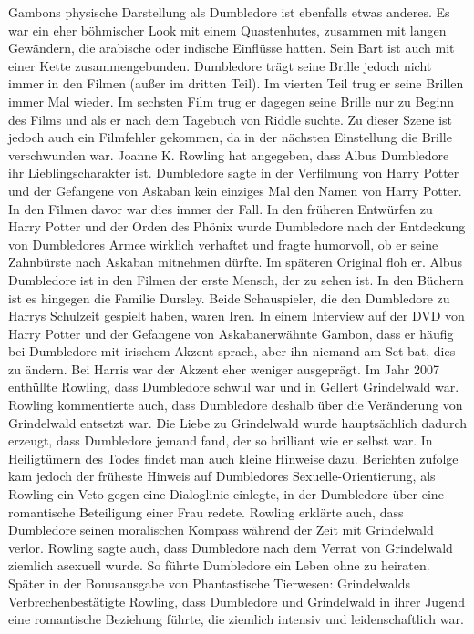 \documentclass[a4paper, 10pt]{article}
\begin{document}
Gambons physische Darstellung als Dumbledore ist ebenfalls etwas anderes. Es war ein eher böhmischer Look mit einem Quastenhutes, zusammen mit langen Gewändern, die arabische oder indische Einflüsse hatten. Sein Bart ist auch mit einer Kette zusammengebunden. Dumbledore trägt seine Brille jedoch nicht immer in den Filmen (außer im dritten Teil). Im vierten Teil trug er seine Brillen immer Mal wieder. Im sechsten Film trug er dagegen seine Brille nur zu Beginn des Films und als er nach dem Tagebuch von Riddle suchte. Zu dieser Szene ist jedoch auch ein Filmfehler gekommen, da in der nächsten Einstellung die Brille verschwunden war.
\vspace{10pt}
\newline
{}  
Joanne K. Rowling hat angegeben, dass Albus Dumbledore ihr Lieblingscharakter ist.
Dumbledore sagte in der Verfilmung von Harry Potter und der Gefangene von Askaban kein einziges Mal den Namen von Harry Potter. In den Filmen davor war dies immer der Fall.
In den früheren Entwürfen zu Harry Potter und der Orden des Phönix wurde Dumbledore nach der Entdeckung von Dumbledores Armee wirklich verhaftet und fragte humorvoll, ob er seine Zahnbürste nach Askaban mitnehmen dürfte. Im späteren Original floh er.
Albus Dumbledore ist in den Filmen der erste Mensch, der zu sehen ist. In den Büchern ist es hingegen die Familie Dursley.
\vspace{10pt}
\newline
{}  
Beide Schauspieler, die den Dumbledore zu Harrys Schulzeit gespielt haben, waren Iren. In einem Interview auf der DVD von Harry Potter und der Gefangene von Askabanerwähnte Gambon, dass er häufig bei Dumbledore mit irischem Akzent sprach, aber ihn niemand am Set bat, dies zu ändern. Bei Harris war der Akzent eher weniger ausgeprägt.
\vspace{10pt}
\newline
{}  
Im Jahr 2007 enthüllte Rowling, dass Dumbledore schwul war und in Gellert Grindelwald war. Rowling kommentierte auch, dass Dumbledore deshalb über die Veränderung von Grindelwald entsetzt war. Die Liebe zu Grindelwald wurde hauptsächlich dadurch erzeugt, dass Dumbledore jemand fand, der so brilliant wie er selbst war. In Heiligtümern des Todes findet man auch kleine Hinweise dazu. Berichten zufolge kam jedoch der früheste Hinweis auf Dumbledores Sexuelle-Orientierung, als Rowling ein Veto gegen eine Dialoglinie einlegte, in der Dumbledore über eine romantische Beteiligung einer Frau redete. Rowling erklärte auch, dass Dumbledore seinen moralischen Kompass während der Zeit mit Grindelwald verlor. Rowling sagte auch, dass Dumbledore nach dem Verrat von Grindelwald ziemlich asexuell wurde. So führte Dumbledore ein Leben ohne zu heiraten. Später in der Bonusausgabe von Phantastische Tierwesen: Grindelwalds Verbrechenbestätigte Rowling, dass Dumbledore und Grindelwald in ihrer Jugend eine romantische Beziehung führte, die ziemlich intensiv und leidenschaftlich war.
\end{document}
